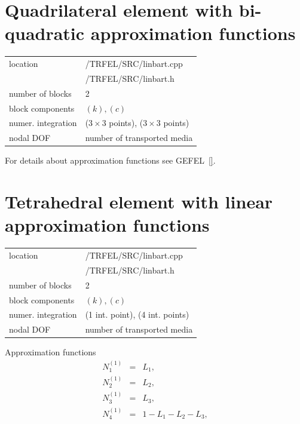 \section{Quadrilateral element with bi-quadratic approximation functions}
\label{quadquadt}

\begin{center}
\begin{tabular}{|l|l|}
\hline
location & /TRFEL/SRC/linbart.cpp\\
         & /TRFEL/SRC/linbart.h
\\ \hline
number of blocks & 2
\\ \hline
block components & $(k), (c)$
\\ \hline
numer. integration & ($3 \times 3$ points), ($3 \times 3$ points)
\\ \hline
nodal DOF & number of transported media
\\ \hline
\end{tabular}
\end{center}

For details about approximation functions see GEFEL~\ref{}.

\section{Tetrahedral element with linear approximation functions}
\label{lintett}

\begin{center}
\begin{tabular}{|l|l|}
\hline
location & /TRFEL/SRC/linbart.cpp\\
         & /TRFEL/SRC/linbart.h
\\ \hline
number of blocks & 2
\\ \hline
block components & $(k), (c)$
\\ \hline
numer. integration & (1 int. point), (4 int. points)
\\ \hline
nodal DOF & number of transported media
\\ \hline
\end{tabular}
\end{center}

Approximation functions
\begin{eqnarray}
N_1^{(1)} &=& L_1,\nonumber\\
N_2^{(1)} &=& L_2,\nonumber\\
N_3^{(1)} &=& L_3,\\
N_4^{(1)} &=& 1-L_1-L_2-L_3,\nonumber
\end{eqnarray}

